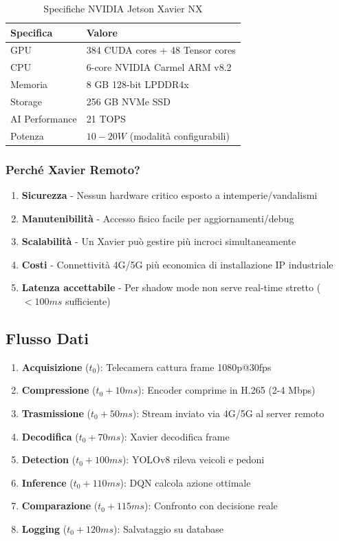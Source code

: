 \documentclass[a4paper,11pt]{article}
\begin{document}
\begin{table}[H]
    \centering
    \begin{tabular}{ll}
        \toprule
        \textbf{Specifica} & \textbf{Valore} \\
        \midrule
        GPU & 384 CUDA cores + 48 Tensor cores \\
        CPU & 6-core NVIDIA Carmel ARM v8.2 \\
        Memoria & 8 GB 128-bit LPDDR4x \\
        Storage & 256 GB NVMe SSD \\
        AI Performance & 21 TOPS \\
        Potenza & $10-20W$ (modalità configurabili) \\
        \bottomrule
    \end{tabular}
    \caption{Specifiche NVIDIA Jetson Xavier NX}
\end{table}

\subsubsection{Perché Xavier Remoto?}

\begin{enumerate}
    \item \textbf{Sicurezza} - Nessun hardware critico esposto a intemperie/vandalismi
    \item \textbf{Manutenibilità} - Accesso fisico facile per aggiornamenti/debug
    \item \textbf{Scalabilità} - Un Xavier può gestire più incroci simultaneamente
    \item \textbf{Costi} - Connettività 4G/5G più economica di installazione IP industriale
    \item \textbf{Latenza accettabile} - Per shadow mode non serve real-time stretto ($<100ms$ sufficiente)
\end{enumerate}

\subsection{Flusso Dati}

\begin{enumerate}
    \item \textbf{Acquisizione} ($t_0$): Telecamera cattura frame 1080p@30fps
    \item \textbf{Compressione} ($t_0 + 10ms$): Encoder comprime in H.265 (2-4 Mbps)
    \item \textbf{Trasmissione} ($t_0 + 50ms$): Stream inviato via 4G/5G al server remoto
    \item \textbf{Decodifica} ($t_0 + 70ms$): Xavier decodifica frame
    \item \textbf{Detection} ($t_0 + 100ms$): YOLOv8 rileva veicoli e pedoni
    \item \textbf{Inference} ($t_0 + 110ms$): DQN calcola azione ottimale
    \item \textbf{Comparazione} ($t_0 + 115ms$): Confronto con decisione reale
    \item \textbf{Logging} ($t_0 + 120ms$): Salvataggio su database
\end{enumerate}
\end{document}
